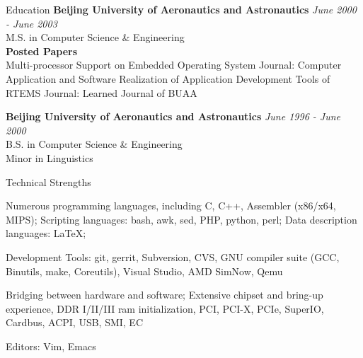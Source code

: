 \documentclass{resume} %
\begin{document}

\begin{rSection}{Education}
{\bf Beijing University of Aeronautics and Astronautics } \hfill {\em June 2000 - June 2003} \\ 
M.S. in Computer Science \& Engineering \\

{\bf Posted Papers }   \\
 Multi-processor Support on Embedded Operating System
                        Journal: Computer Application and Software
 Realization of Application Development Tools of RTEMS
                        Journal: Learned Journal of BUAA


{\bf Beijing University of Aeronautics and Astronautics } \hfill {\em June 1996 - June 2000} \\ 
B.S. in Computer Science \& Engineering \\
Minor in Linguistics \smallskip \\

\end{rSection}




\begin{rSection}{Technical Strengths}

\item Numerous programming languages, including C, C++, Assembler (x86/x64,
MIPS); Scripting languages: bash, awk, sed, PHP, python, perl; Data description languages: LaTeX;

\item Development Tools: git, gerrit, Subversion, CVS,
GNU compiler suite (GCC, Binutils, make, Coreutils), Visual Studio, AMD SimNow, Qemu

\item Bridging between hardware and software; Extensive chipset and bring-up
experience, DDR I/II/III ram initialization, PCI, PCI-X, PCIe, SuperIO, Cardbus, ACPI, USB,
SMI, EC

\item Editors: Vim, Emacs

\end{rSection}





\end{document}
